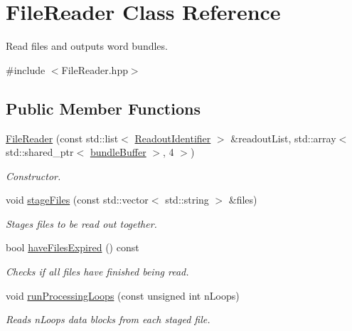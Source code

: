 \hypertarget{class_file_reader}{}\section{File\+Reader Class Reference}
\label{class_file_reader}


Read files and outputs word bundles.  




{\ttfamily \#include $<$File\+Reader.\+hpp$>$}

\subsection*{Public Member Functions}
\begin{DoxyCompactItemize}
\item 
\hyperlink{class_file_reader_ae28a071d5fcba5b845ea3382a5cb2cfe}{File\+Reader} (const std\+::list$<$ \hyperlink{class_readout_identifier}{Readout\+Identifier} $>$ \&readout\+List, std\+::array$<$ std\+::shared\+\_\+ptr$<$ \hyperlink{class_file_reader_ac755c1e271610c2c12a7fc5b55cc048b}{bundle\+Buffer} $>$, 4 $>$)
\begin{DoxyCompactList}\small\item\em Constructor. \end{DoxyCompactList}\item 
void \hyperlink{class_file_reader_a5d487d37857d537ace41c31d6594ef3a}{stage\+Files} (const std\+::vector$<$ std\+::string $>$ \&files)
\begin{DoxyCompactList}\small\item\em Stages files to be read out together. \end{DoxyCompactList}\item 
bool \hyperlink{class_file_reader_a58b80f2c9c2ec8381527bdfca1008007}{have\+Files\+Expired} () const
\begin{DoxyCompactList}\small\item\em Checks if all files have finished being read. \end{DoxyCompactList}\item 
void \hyperlink{class_file_reader_a478ed77f1b8f76e15cb2faa8964a26e6}{run\+Processing\+Loops} (const unsigned int n\+Loops)
\begin{DoxyCompactList}\small\item\em Reads n\+Loops data blocks from each staged file. \end{DoxyCompactList}\end{DoxyCompactItemize}
